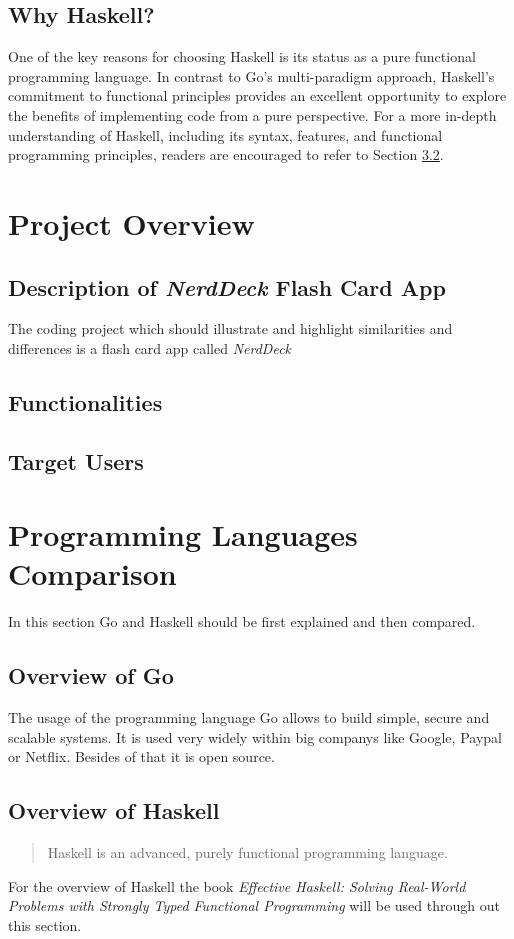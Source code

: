 \section{Why Haskell?}\label{sec:whyhaskell}
One of the key reasons for choosing Haskell is its status as a pure functional programming language. In contrast to Go's multi-paradigm approach, Haskell's commitment to functional principles provides an excellent opportunity to explore the benefits of implementing code from a pure perspective.
For a more in-depth understanding of Haskell, including its syntax, features, and functional programming principles, readers are encouraged to refer to Section \ref{sec:haskell-overview}.

\chapter{Project Overview}\label{chap:project-overview}
    \section{Description of \textit{NerdDeck} Flash Card App}\label{sec:description}
The coding project which should illustrate and highlight similarities and differences is a flash card app called \textit{NerdDeck}
    \section{Functionalities}\label{sec:functionalities}
    \section{Target Users}\label{sec:target-users}

\chapter{Programming Languages Comparison}\label{chap:language-comparison}
In this section Go and Haskell should be first explained and then compared.

    \section{Overview of Go}\label{sec:go-overview}
The usage of the programming language Go allows to build simple, secure and scalable systems. It is used very widely within big companys like Google, Paypal or Netflix. Besides of that it is open source. \cite{GoWebsite}
    \section{Overview of Haskell}\label{sec:haskell-overview}
    \begin{quote}
       Haskell is an advanced, purely functional programming language.\cite{HaskellWebsite}  
    \end{quote}
For the overview of Haskell the book \textit{Effective Haskell: Solving Real-World Problems with Strongly Typed Functional Programming} \cite{Skinner} will be used through out this section.
